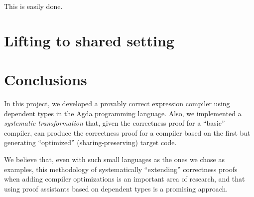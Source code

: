 \documentclass[a4paper]{article}
\begin{document}
        
        This is easily done.


    \section{Lifting to shared setting}
    \label{sec:lifting}


          



    \section{Conclusions}
    \label{sec:conclusions}
        In this project, we developed a provably correct expression compiler using dependent types in the Agda programming language.
        Also, we implemented a \emph{systematic transformation} that, given the correctness proof for
        a ``basic'' compiler, can produce the correctness proof for a compiler based on the first but
        generating ``optimized'' (sharing-preserving) target code.

        We believe that, even with such small languages as the ones we chose as examples,
        this methodology of systematically ``extending'' correctness proofs when adding compiler optimizations
        is an important area of research, and that using proof assistants based on dependent types is a
        promising approach.
\end{document}
